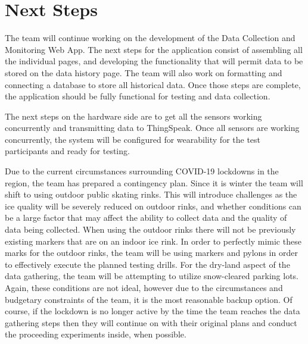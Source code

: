 \section{Next Steps}

The team will continue working on the development of the Data Collection and Monitoring Web App. The next steps for the application consist of assembling all the individual pages, and developing the functionality that will permit data to be stored on the data history page. The team will also work on formatting and connecting a database to store all historical data. Once those steps are complete, the application should be fully functional for testing and data collection. 

The next steps on the hardware side are to get all the sensors working concurrently and transmitting data to ThingSpeak. Once all sensors are working concurrently, the system will be configured for wearability for the test participants and ready for testing.   

Due to the current circumstances surrounding COVID-19 lockdowns in the region, the team has prepared a contingency plan. Since it is winter the team will shift to using outdoor public skating rinks. This will introduce challenges as the ice quality will be severely reduced on outdoor rinks, and whether conditions can be a large factor that may affect the ability to collect data and the quality of data being collected. When using the outdoor rinks there will not be previously existing markers that are on an indoor ice rink. In order to perfectly mimic these marks for the outdoor rinks, the team will be using markers and pylons in order to effectively execute the planned testing drills. For the dry-land aspect of the data gathering, the team will be attempting to utilize snow-cleared parking lots. Again, these conditions are not ideal, however due to the circumstances and budgetary constraints of the team, it is the most reasonable backup option. Of course, if the lockdown is no longer active by the time the team reaches the data gathering steps then they will continue on with their original plans and conduct the proceeding experiments inside, when possible. 
